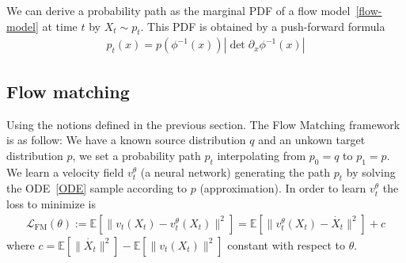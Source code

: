 \documentclass{article}
\begin{document}
We can derive a probability path as the marginal PDF of a flow model~\ref{flow-model} at time \(t\) by \(X_t\sim p_t\). This PDF is obtained by a push-forward formula 
\begin{align}\label{pushforward}
    p_t(x) = p(\phi^{-1}(x))|\det \partial_x \phi^{-1}(x)|
\end{align} 

\begin{comment}
\subsection{Continuous normalizing flow}

In continuous normalizing flow framework, \(f\) is obtained using a continuous dynamic 
\begin{align}
    \frac{\partial x_0}{\partial t} = f(x_t,t)
\end{align}
In continuous normalizing flows, \(f\) is obtzined by solving the neural ODE 
\begin{align}
    x_T = x_0+\int_0^T f(x_t,t)^{\theta} dt
\end{align}

CNF are trained by maximizing the log-likelyhood 
\begin{align}
    \mathcal{L}(\theta) = \mathbb{E}[\log p(x)]
\end{align}
\end{comment}

\subsection{Flow matching}

Using the notions defined in the previous section. The Flow Matching framework is as follow: 
We have a known source distribution \(q\) and an unkown target distribution \(p\), we set a probability path \(p_t\) interpolating from \(p_0=q\) to \(p_1=p\). We learn a velocity field \(v_t^\theta\) (a neural network) generating the path \(p_t\) by solving the ODE~\ref{ODE} sample according to \(p\) (approximation). In order to learn \(v_t^\theta\) the loss to minimize is 
\begin{align}
    \mathcal{L}_\text{FM}(\theta):=\mathbb{E}[\|v_t(X_t)-v_t^\theta(X_t)\|^2]= \mathbb{E}[\|v_t^\theta(X_t)-\dot{X_t}\|^2] + c
\end{align} 
where \(c = \mathbb{E}[\|\dot{X_t}\|^2]-\mathbb{E}[\|v_t(X_t)\|^2]\) constant with respect to \(\theta\). \\
\end{document}
